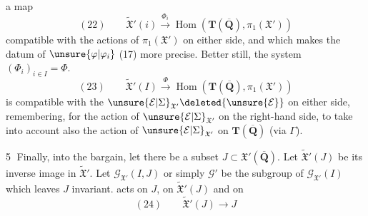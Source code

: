 a map
\[
(22)\qquad\widetilde{\mathfrak X}'(i)\xrightarrow{\Phi_i}\operatorname{Hom}(\mathbf T(\overline{\mathbf Q}),\pi_1(\mathfrak X'))
\]
compatible with the actions of $\pi_1(\mathfrak X')$
on either side, and which makes
the datum of $\unsure{\varphi|\varphi_i}$ (17) more precise. Better still,
the system $(\Phi_i)_{i\in I}=\Phi$.
\[
(23)\qquad\widetilde{\mathfrak X}'(I)\xrightarrow{\Phi}\operatorname{Hom}(\mathbf T(\overline{\mathbf Q}),\pi_1(\mathfrak X'))
\]
is compatible with the $\unsure{\mathcal E|\Sigma}_{\mathfrak X'}\deleted{\unsure{\mathcal E}}$ on either
side, remembering, for the action
of $\unsure{\mathcal E|\Sigma}_{\mathfrak X'}$ on the right-hand side, to take
into account also the action of $\unsure{\mathcal E|\Sigma}_{\mathfrak X'}$
on $\mathbf T(\overline{\mathbf Q})$ (via $\Gamma$).

\textcircled{5} Finally, into the bargain, let there be a
subset $J\subset\mathfrak X'(\overline{\mathbf Q})$. Let $\widetilde{\mathfrak X}'(J)$ be its
inverse image in $\widetilde{\mathfrak X}'$. Let $\mathcal G_{\mathfrak X'}(I,J)$
or simply $\mathcal G'$ be the subgroup of $\mathcal G_{\mathfrak X'}(I)$
which leaves $J$ invariant.  
acts on $J$, on $\widetilde{\mathfrak X}'(J)$ and on
\[
(24)\qquad\widetilde{\mathfrak X}'(J)\longrightarrow J
\]
